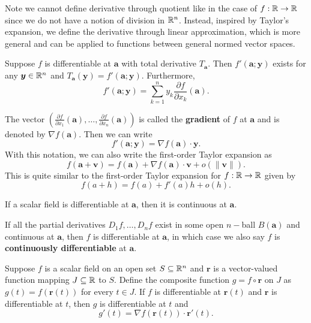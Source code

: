     \begin{remarkenv}
        Note we cannot define derivative through quotient like in the case of $f:\mathbb{R} \to \mathbb{R}$ since we do not have a notion of division in $\mathbb{R}^n$. Instead, inspired by Taylor's expansion, we define the derivative through linear approximation, which is more general and can be applied to functions between general normed vector spaces.
    \end{remarkenv}
    \begin{theoremenv}
        Suppose $f$ is differentiable at $\bm a$ with total derivative $T_{\bm a}$. Then $f'(\bm a; \bm y)$ exists for any $\bm y\in \mathbb{R}^n$ and $T_{\bm a}(\bm y) = f'(\bm a; \bm y)$. Furthermore, 
        $$ f'(\bm a; \bm y) = \sum_{k=1}^n y_k \frac{\partial f}{\partial x_k}(\bm a). $$
    \end{theoremenv}
    \begin{notationenv}
        The vector $\displaystyle\left(\frac{\partial f}{\partial x_1}(\bm a), \ldots, \frac{\partial f}{\partial x_n}(\bm a)\right)$ is called the \textbf{gradient} of $f$ at $\bm a$ and is denoted by $\nabla f(\bm a)$. Then we can write $$f'(\bm a; \bm y) = \nabla f(\bm a) \cdot \bm y.$$
        With this notation, we can also write the first-order Taylor expansion as
        $$ f(\bm a + \bm v) = f(\bm a) + \nabla f(\bm a) \cdot \bm v + o(\|\bm v\|). $$
        This is quite similar to the first-order Taylor expansion for $f:\mathbb{R} \to \mathbb{R}$ given by
        $$ f(a + h) = f(a) + f'(a) h + o(h). $$
    \end{notationenv}
    \begin{theoremenv}
        If a scalar field is differentiable at $\bm a$, then it is continuous at $\bm a$.
    \end{theoremenv}
    \begin{theoremenv}
        If all the partial derivatives $D_1 f, \ldots, D_n f$ exist in some open $n-$ball $B(\bm a)$ and continuous at $\bm a$, then $f$ is differentiable at $\bm a$, in which case we also say $f$ is \textbf{continuously differentiable} at $\bm a$.
    \end{theoremenv}
    \begin{theoremenv}
        Suppose $f$ is a scalar field on an open set $S\subseteq \mathbb{R}^n$ and $\bm r$ is a vector-valued function mapping $J\subseteq \mathbb{R}$ to $S$. Define the composite function $g = f \circ \bm r$ on $J$ as $g(t) = f(\bm r(t))$ for every $t\in J$. If $f$ is differentiable at $\bm r(t)$ and $\bm r$ is differentiable at $t$, then $g$ is differentiable at $t$ and
        $$ g'(t) = \nabla f(\bm r(t)) \cdot \bm r'(t). $$
    \end{theoremenv}
